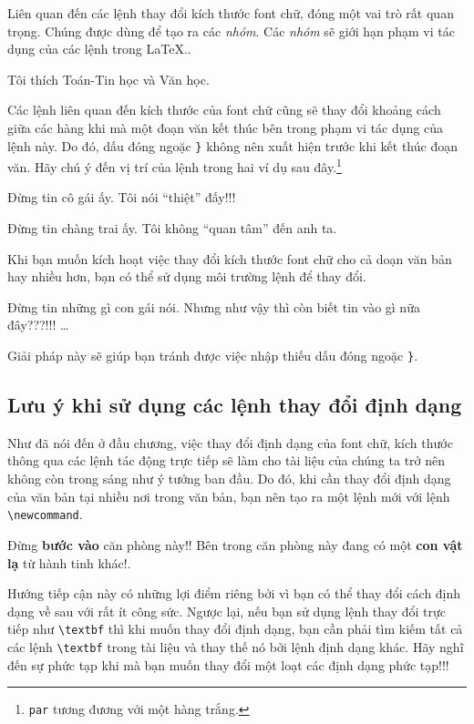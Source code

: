 Liên quan đến các lệnh thay đổi kích thước font chữ,  đóng một vai trò rất quan trọng. Chúng được dùng để tạo ra
các \emph{nhóm}. Các \emph{nhóm} sẽ giới hạn phạm vi tác dụng của
các lệnh trong \LaTeX{}..

\begin{example}
Tôi thích {\LARGE Toán-Tin học
và {\small Văn học}}.
\end{example}
Các lệnh liên quan đến kích thước của font chữ cũng sẽ thay đổi
khoảng cách giữa các hàng khi mà một đoạn văn kết thúc bên trong
phạm vi tác dụng của lệnh này. Do đó, dấu đóng ngoặc \verb|}|
không nên xuất hiện trước khi kết thúc đoạn văn. Hãy chú ý đến vị
trí của lệnh  trong hai ví dụ sau
đây.\footnote{\texttt{\bs{}par} tương đương với một hàng trắng.}

\begin{example}
{\Large Đừng tin cô gái ấy.
Tôi nói ``thiệt'' đấy!!!\par}
\end{example}

\begin{example}
{\Large Đừng tin chàng trai ấy.
Tôi không ``quan tâm'' đến anh
ta.}\par
\end{example}
Khi bạn muốn kích hoạt việc thay đổi kích thước font chữ cho cả
doạn văn bản hay nhiều hơn, bạn có thể sử dụng môi trường lệnh để
thay đổi.
\begin{example}
\begin{Large}
Đừng tin những gì con
gái nói. Nhưng như vậy
thì còn biết tin vào
gì nữa đây???!!! \ldots
\end{Large}
\end{example}

\noindent Giải pháp này sẽ giúp bạn tránh được việc nhập thiếu dấu
đóng ngoặc \verb|}|.

\subsection{Lưu ý khi sử dụng các lệnh thay đổi định dạng}
Như đã nói đến ở đầu chương, việc thay đổi định dạng của font chữ,
kích thước thông qua các lệnh tác động trực tiếp sẽ làm cho tài
liệu của chúng ta trở nên không còn trong sáng như ý tưởng ban
đầu. Do đó, khi cần thay đổi định dạng của văn bản tại nhiều nơi
trong văn bản, bạn nên tạo ra một lệnh mới với lệnh
\verb|\newcommand|.

\begin{example}
\newcommand{\oops}[1]{\textbf{#1}}
Đừng \oops{bước vào} căn
phòng này!! Bên trong căn
phòng này đang
có một \oops{con vật lạ}
từ hành tinh khác!.
\end{example}
Hướng tiếp cận này có những lợi điểm riêng bởi vì bạn có thể thay
đổi cách định dạng về sau với rất ít công sức. Ngược lại, nếu bạn
sử dụng lệnh thay đổi trực tiếp như \verb|\textbf| thì khi muốn
thay đổi định dạng, bạn cần phải tìm kiếm tất cả các lệnh
\verb|\textbf| trong tài liệu và thay thế nó bởi lệnh định dạng
khác. Hãy nghĩ đến sự phức tạp khi mà bạn muốn thay đổi một loạt
các định dạng phức tạp!!!

